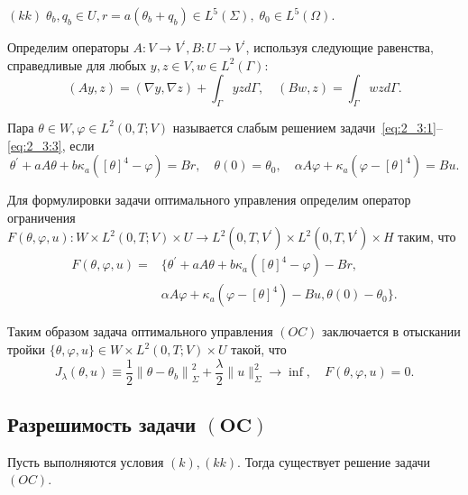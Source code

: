 $(kk)\; \theta_{b}, q_{b} \in U, r=a\left(\theta_{b}+q_{b}\right)
\in L^{5}(\Sigma), \; \theta_{0} \in L^{5}(\Omega)$.


Определим операторы $A: V \rightarrow V^{\prime}, B: U \rightarrow V^{\prime}$,
используя следующие равенства, справедливые для любых
$y, z \in V, w \in L^{2}(\Gamma)$:
\[
    (A y, z)=(\nabla y, \nabla z)+\int_{\Gamma} y z d \Gamma,
    \quad(B w, z)=\int_{\Gamma} w z d \Gamma.
\]
\begin{definition}
    Пара $\theta \in W, \varphi \in L^{2}(0, T ; V)$ называется слабым
    решением задачи~\eqref{eq:2_3:1}--\eqref{eq:2_3:3}, если
    \begin{equation}
        \label{eq:2_3:6}
        \theta^{\prime}+a A \theta+b \kappa_{a}\left([\theta]^{4}-\varphi\right)=B r,
        \quad \theta(0)=\theta_{0}, \quad \alpha A \varphi
        + \kappa_{a}\left(\varphi-[\theta]^{4}\right)=B u.
    \end{equation}
\end{definition}

Для формулировки задачи оптимального управления определим оператор ограничения
$F(\theta, \varphi, u): W \times L^{2}(0, T; V) \times U
\rightarrow L^{2} \left(0, T, V^{\prime}\right)
\times L^{2}\left(0, T, V^{\prime}\right) \times H$ таким, что
\[
    \begin{aligned}
        F(\theta, \varphi, u)= & \{\theta^{\prime}+a A
        \theta+b \kappa_{a}\left([\theta]^{4}-\varphi\right)-B r, \\
        & \alpha A \varphi+\kappa_{a}\left(\varphi-[\theta]^{4}\right)-B u,
        \theta(0)-\theta_{0}\}.
    \end{aligned}
\]

Таким образом задача оптимального управления $(OC)$ заключается в отыскании тройки
$\{\theta, \varphi, u\} \in W \times L^{2}(0, T ; V) \times U$ такой, что
\[
    J_{\lambda}(\theta, u) \equiv \frac{1}{2}\left\|\theta-
    \theta_{b}\right\|_{\Sigma}^{2}+
    \frac{\lambda}{2}\|u\|_{\Sigma}^{2}
    \rightarrow \inf, \quad F(\theta, \varphi, u)=0.
\]

\subsection{Разрешимость задачи $(\mathbf{OC})$}
\label{subsec:ch2/sec3/subsec3}

\begin{theorem}
    \label{th:2_3:1}
    Пусть выполняются условия $(k), (kk)$.
    Тогда существует решение задачи $(OC)$.
\end{theorem}


